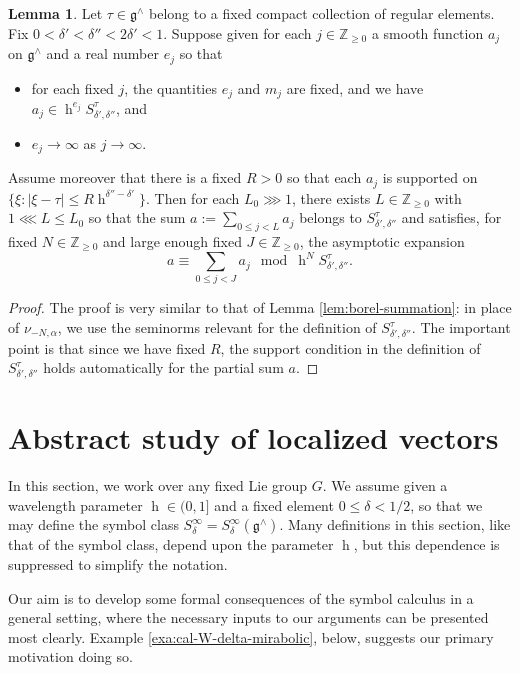 \documentclass[reqno]{amsart}
\DeclareMathOperator{\h}{h}
\theoremstyle{plain} \newtheorem{theorem} {Theorem}
\theoremstyle{definition} \newtheorem{definition} [theorem] {Definition}
\theoremstyle{itplain} %
\newtheorem{lemma}[theorem]{Lemma}
\numberwithin{equation}{section}
\numberwithin{theorem}{section}
\renewcommand{\geq}{\geqslant}
\renewcommand{\leq}{\leqslant}
\begin{document}
\begin{lemma}
  Let $\tau \in \mathfrak{g}^\wedge$ belong to a fixed compact collection of regular elements.  Fix $0 < \delta ' < \delta '' < 2 \delta ' < 1$.  Suppose given for each $j \in \mathbb{Z}_{\geq 0}$ a smooth function $a_j$ on $\mathfrak{g}^\wedge$ and a real number $e_j$ so that
  \begin{itemize}
  \item for each fixed $j$, the quantities $e_j$ and $m_j$ are fixed, and we have $a_j \in \h^{e_j} S^{\tau}_{\delta', \delta ''}$, and
  \item $e_j \rightarrow \infty$ as $j \rightarrow \infty$.
  \end{itemize}
  Assume moreover that there is a fixed $R > 0$ so that each $a_j$ is supported on $\{\xi : |\xi - \tau| \leq R \h^{\delta '' - \delta '}\}$.  Then for each $L_0 \ggg 1$, there exists $L \in \mathbb{Z}_{\geq 0}$ with $1 \lll L \leq L_0$ so that the sum $a := \sum _{0 \leq j < L} a_j$ belongs to $S^{\tau}_{\delta', \delta ''}$ and satisfies, for fixed $N \in \mathbb{Z}_{\geq 0}$ and large enough fixed $J \in \mathbb{Z}_{\geq 0}$, the asymptotic expansion
  \[
    a \equiv \sum_{0 \leq j < J} a_j \mod{\h^N S^{\tau }_{\delta', \delta ''}}.
  \]
\end{lemma}
\begin{proof}
  The proof is very similar to that of Lemma \ref{lem:borel-summation}: in place of $\nu_{-N,\alpha}$, we use the seminorms relevant for the definition of $S^\tau_{\delta ', \delta ''}$.  The important point is that since we have fixed $R$, the support condition in the definition of $S_{\delta ', \delta ''}^{\tau}$ holds automatically for the partial sum $a$.
\end{proof}



\section{Abstract study of localized vectors}\label{sec:abstr-study-local}
In this section, we work over any fixed Lie group $G$.  We assume given a wavelength parameter $\h \in (0,1]$ and a fixed element $0 \leq \delta < 1/2$, so that we may define the symbol class $S_\delta^\infty = S_\delta^\infty(\mathfrak{g}^\wedge)$.  Many definitions in this section, like that of the symbol class, depend upon the parameter $\h$, but this dependence is suppressed to simplify the notation.

Our aim is to develop some formal consequences of the symbol calculus in a general setting, where the necessary inputs to our arguments can be presented most clearly.  Example \ref{exa:cal-W-delta-mirabolic}, below, suggests our primary motivation doing so.
\end{document}
